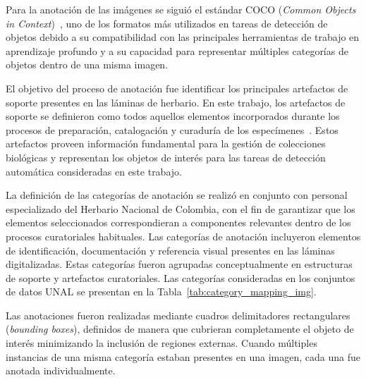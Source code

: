 Para la anotación de las imágenes se siguió el estándar COCO (\textit{Common Objects in Context})~\cite{COCOdataset}, uno de los formatos más utilizados en tareas de detección de objetos debido a su compatibilidad con las principales herramientas de trabajo en aprendizaje profundo y a su capacidad para representar múltiples categorías de objetos dentro de una misma imagen.

El objetivo del proceso de anotación fue identificar los principales artefactos de soporte presentes en las láminas de herbario. En este trabajo, los artefactos de soporte se definieron como todos aquellos elementos incorporados durante los procesos de preparación, catalogación y curaduría de los especímenes~\cite{}. Estos artefactos proveen información fundamental para la gestión de colecciones biológicas y representan los objetos de interés para las tareas de detección automática consideradas en este trabajo.

La definición de las categorías de anotación se realizó en conjunto con personal especializado del Herbario Nacional de Colombia, con el fin de garantizar que los elementos seleccionados correspondieran a componentes relevantes dentro de los procesos curatoriales habituales. Las categorías de anotación incluyeron elementos de identificación, documentación y referencia visual presentes en las láminas digitalizadas. Estas categorías fueron agrupadas conceptualmente en estructuras de soporte y artefactos curatoriales. Las categorías consideradas en los conjuntos de datos UNAL se presentan en la Tabla~\ref{tab:category_mapping_img}.

Las anotaciones fueron realizadas mediante cuadros delimitadores rectangulares (\textit{bounding boxes}), definidos de manera que cubrieran completamente el objeto de interés minimizando la inclusión de regiones externas. Cuando múltiples instancias de una misma categoría estaban presentes en una imagen, cada una fue anotada individualmente.

